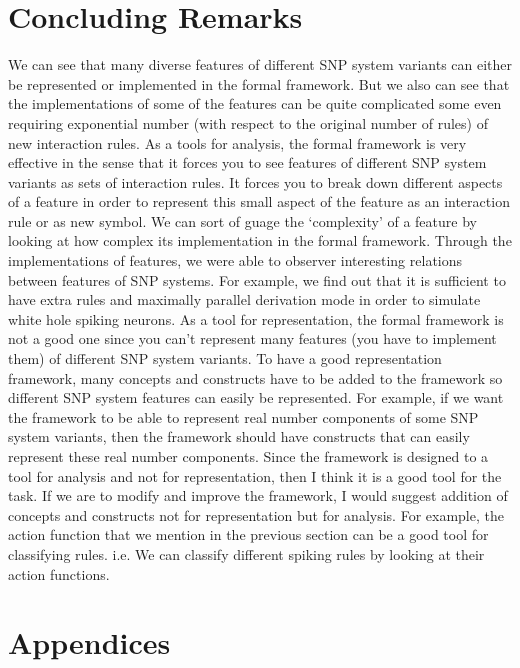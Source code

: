 \documentclass[a4paper]{article}
\theoremstyle{definition}
\begin{document}
\section{Concluding Remarks}

We can see that many diverse features of different SNP system variants can either be represented 
or implemented in the formal framework. But we also can see that the implementations of some of
the features can be quite complicated some even requiring exponential number (with respect to
the original number of rules)  of new interaction rules. As a tools for analysis, the formal 
framework is very effective in the sense that it forces you to see features of different SNP
system variants as sets of interaction rules. It forces you to break down different aspects of a
feature in order to represent this small aspect of the feature as an interaction rule or as 
new symbol. We can sort of guage the `complexity' of a feature by looking at how complex its
implementation in the formal framework. Through the implementations of features, we were able to
observer interesting relations between features of SNP systems. For example, we find out that it
is sufficient to have extra rules and maximally parallel derivation mode in order to simulate
white hole spiking neurons. As a tool for representation, the formal framework is not a good one
since you can't represent many features (you have to implement them) of different SNP system variants.
To have a good representation framework, many concepts and constructs have to be added to the 
framework so different SNP system features can easily be represented. For example, if we want the
framework to be able to represent real number components of some SNP system variants, then the 
framework should have constructs that can easily represent these real number components. Since the
framework is designed to a tool for analysis and not for representation, then I think it is a good
tool for the task. If we are to modify and improve the framework, I would suggest addition of
concepts and constructs not for representation but for analysis. For example, the action function
that we mention in the previous section can be a good tool for classifying rules. i.e. We can
classify different spiking rules by looking at their action functions.


\appendix{}

\section*{Appendices}\label{app}
\end{document}
